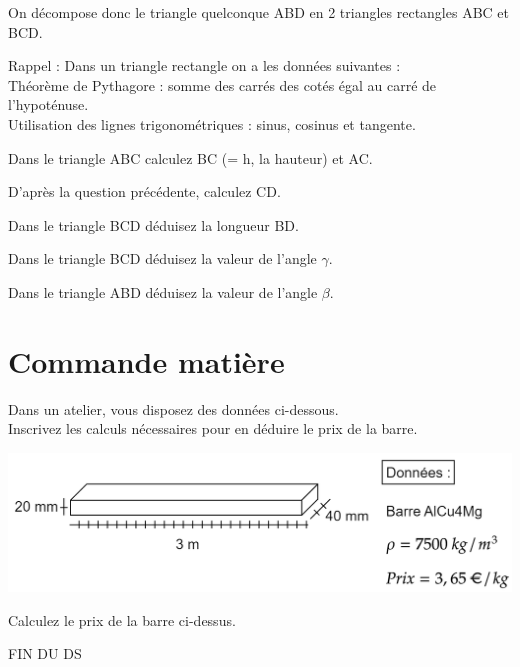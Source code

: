 \documentclass[12pt,a4paper]{article} %
\begin{document}
On décompose donc le triangle quelconque ABD en 2 triangles rectangles ABC et BCD.\\
\begin{tcolorbox}[colback=blue!5!white,colframe=black!75!black] 
Rappel : Dans un triangle rectangle on a les données suivantes :\\
Théorème de Pythagore : somme des carrés des cotés égal au carré de l’hypoténuse.\\
Utilisation des lignes trigonométriques : sinus, cosinus et tangente.\\
\end{tcolorbox}


\begin{exo} Dans le triangle ABC calculez BC (= h, la hauteur) et AC.\end{exo}

\begin{exo} D'après la question précédente, calculez CD.\end{exo}

\begin{exo} Dans le triangle BCD déduisez la longueur BD.\end{exo}

\begin{exo} Dans le triangle BCD déduisez la valeur de l'angle $\gamma$.\end{exo}

\begin{exo} Dans le triangle ABD déduisez la valeur de l'angle $\beta$.\end{exo}

\newpage

\section{Commande matière}
\begin{tcolorbox}[colback=blue!5!white,colframe=black!75!black] 
Dans un atelier, vous disposez des données ci-dessous.\\
Inscrivez les calculs nécessaires pour en déduire le prix de la barre.
\end{tcolorbox}
\includegraphics[scale=1]{Barre.png}

\begin{exo} Calculez le prix de la barre ci-dessus.\end{exo}

\begin{center}
    FIN DU DS
\end{center}


\end{document}
